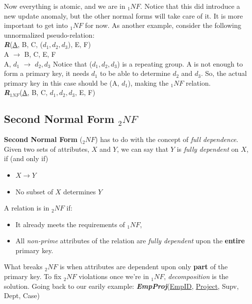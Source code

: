 \documentclass{report}
\begin{document}
    \bigbreak \noindent
    Now everything is atomic, and we are in $_1NF$. Notice that this did introduce a new update anomaly, but the other normal forms will take care of it. It is more important to get into $_1NF$ for now.
    As another example, consider the following unnormalized pseudo-relation: \vspace{1.5mm}\\
    \textit{\textbf{R}}(\underline{A}, B, C, ($d_1,d_2,d_3$), E, F) \vspace{1.5mm}\\
    A $\rightarrow$ B, C, E, F \\
    A, $d_1$ $\rightarrow$ $d_2, d_3$
    \bigbreak \noindent
    Notice that ($d_1,d_2,d_3$) is a repeating group. A is not enough to form a primary key, it needs $d_1$ to be able to determine $d_2$ and $d_3$. So, the actual primary key in this case should be (A, $d_1$), making the $_1NF$ relation. \vspace{1.5mm} \\
    \textit{\textbf{R}$_{1NF}$}(\underline{A}, B, C, $d_1, d_2, d_3$, E, F)
    \subsection{Second Normal Form $_2NF$} 
    \textbf{Second Normal Form} ($_2NF$) has to do with the concept of \textit{full dependence}.
    \bigbreak \noindent
    Given two sets of attributes, $X$ and $Y$, we can say that $Y$ is \textit{fully dependent} on $X$, if (and only if)
    \begin{itemize}
        \item $X\rightarrow Y$
        \item No subset of $X$ determines $Y$
    \end{itemize}
    A relation is in $_2NF$ if:
    \begin{itemize}
        \item        It already meets the requirements of $_1NF$,
        \item All \textit{non-prime} attributes of the relation are \textit{fully dependent} upon the \textbf{entire} primary key.
    \end{itemize}
    What breaks $_2NF$ is when attributes are dependent upon only \textbf{part} of the primary key.
    \bigbreak \noindent
    To fix $_2NF$ violations once we're in $_1NF$, \textit{decomposition} is the solution.
    \bigbreak \noindent
    Going back to our earily example: \textit{\textbf{EmpProj}}(\underline{EmpID}, \underline{Project}, Supv, Dept, Case)
\end{document}
